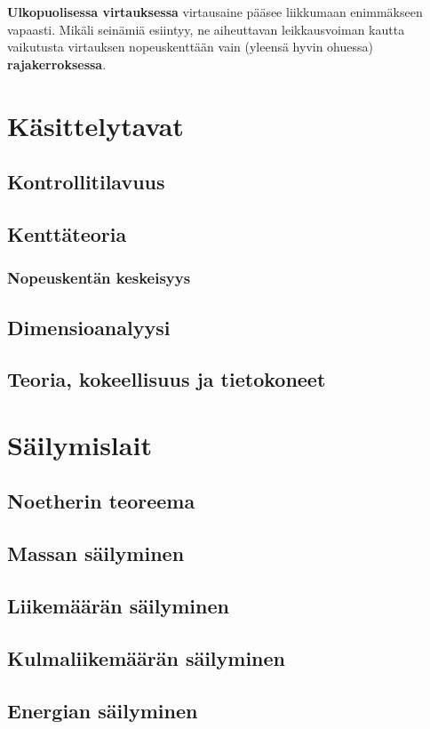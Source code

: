 \documentclass[12pt,a4paper,finnish]{book}
\begin{document}
\textbf{Ulkopuolisessa virtauksessa} virtausaine pääsee liikkumaan enimmäkseen vapaasti. Mikäli 
seinämiä esiintyy, ne aiheuttavan leikkausvoiman kautta vaikutusta virtauksen nopeuskenttään 
vain (yleensä hyvin ohuessa) \textbf{rajakerroksessa}. 


\chapter{Käsittelytavat}
\section{Kontrollitilavuus}
\section{Kenttäteoria}
\subsection{Nopeuskentän keskeisyys}
\section{Dimensioanalyysi}
\section{Teoria, kokeellisuus ja tietokoneet}

\chapter{Säilymislait}
\section{Noetherin teoreema}
\section{Massan säilyminen}
\section{Liikemäärän säilyminen}
\section{Kulmaliikemäärän säilyminen}
\section{Energian säilyminen}
\end{document}
